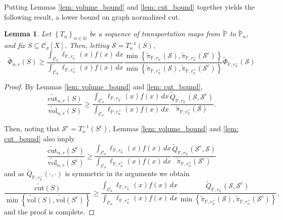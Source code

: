 \documentclass{article}
\newcommand{\set}[1]{\left\{#1\right\}}
\newcommand{\seq}[1]{\left\{#1\right\}_{n \in \mathbb{N}}}
\newcommand{\vol}{\mathrm{vol}}
\newcommand{\cut}{\mathrm{cut}}
\newcommand{\1}{\mathbf{1}}
\newcommand{\Xbf}{X}             %
\newcommand{\Pbb}{\mathbb{P}}
\newcommand{\Sset}{\mathcal{S}}
\newcommand{\Cset}{\mathcal{C}}
\newcommand{\Csig}{\Cset_{\sigma}}
\newcommand{\dx}{\,dx}
\newcommand{\piwt}{\widetilde{\pi}}
\theoremstyle{aldenthm}
\newtheorem{lemma}{Lemma}
\theoremstyle{aldenrmrk}
\begin{document}
Putting Lemmas \ref{lem: volume_bound} and \ref{lem: cut_bound} together yields the following result, a lower bound on graph normalized cut.

\begin{lemma}
	\label{lem: graph_to_continuous_conductance}
	Let $\seq{T_n}$ be a sequence of transportation maps from $\widetilde{\Pbb}$ to $\widetilde{\Pbb}_n$, and fix $S \subseteq \Csig[\Xbf]$. Then, letting $\Sset =T_n^{-1}(S)$,
	\begin{equation}
	\label{eqn: graph_to_continuous_conductance}
	\widetilde{\Phi}_{n,r}(S) \geq \frac{\int_{\Csig} \ell_{\Pbb,r_n^-}(x) f(x) \dx}{\int_{\Csig} \ell_{\Pbb,r_n^+}(x) f(x) \dx}  \frac{\min \set{\piwt_{\Pbb,r_n^-}(\Sset), \piwt_{\Pbb,r_n^-}(\Sset^c)} }{\min \set{\piwt_{\Pbb,r_n^+}(\Sset), \piwt_{\Pbb,r_n^+}(\Sset^c)} } \widetilde{\Phi}_{\Pbb,r_n^{-}}(\Sset)
	\end{equation}
\end{lemma}

\begin{proof}
	
	By Lemmas \ref{lem: volume_bound} and \ref{lem: cut_bound},
	\begin{equation*}
	\frac{\widetilde{\cut}_{n,r}(S)}{\widetilde{\vol}_{n,r}(S)} \geq \frac{\int_{\Csig} \ell_{\Pbb,r_n^-}(x) f(x) \dx}{\int_{\Csig} \ell_{\Pbb,r_n^+}(x) f(x) \dx} \frac{\widetilde{Q}_{\Pbb,r_n^-}(\Sset, \Sset^c)}{\piwt_{\Pbb,r_n^+}(\Sset)}.
	\end{equation*}
	
	Then, noting that $\Sset^c = T_n^{-1}(S^c)$, Lemmas \ref{lem: volume_bound} and \ref{lem: cut_bound} also imply
	\begin{equation*}
	\frac{\widetilde{\cut}_{n,r}(S^c)}{\widetilde{\vol}_{n,r}(S^c)} \geq \frac{\int_{\Csig} \ell_{\Pbb,r_n^-}(x) f(x) \dx}{\int_{\Csig} \ell_{\Pbb,r_n^+}(x) f(x) \dx} \frac{\widetilde{Q}_{\Pbb,r_n^-}(\Sset^c, \Sset)}{\piwt_{\Pbb,r_n^+}(\Sset^c)}
	\end{equation*}
	and as $\widetilde{Q}_{\Pbb,r_n^-}(\cdot, \cdot)$ is symmetric in its arguments we obtain
	\begin{equation*}
	\frac{\widetilde{\cut}(S)}{\min\set{\widetilde{\vol}(S), \widetilde{\vol}(S^c)}} \geq \frac{\int_{\Csig} \ell_{\Pbb,r_n^-}(x) f(x) \dx}{\int_{\Csig} \ell_{\Pbb,r_n^+}(x) f(x) \dx} \frac{\widetilde{Q}_{\Pbb,r_n^-}(\Sset, \Sset^c)}{\min \set{\piwt_{\Pbb,r_n^+}(\Sset), \piwt_{\Pbb,r_n^+}(\Sset^c)} },
	\end{equation*}
	and the proof is complete.
\end{proof}
\end{document}
